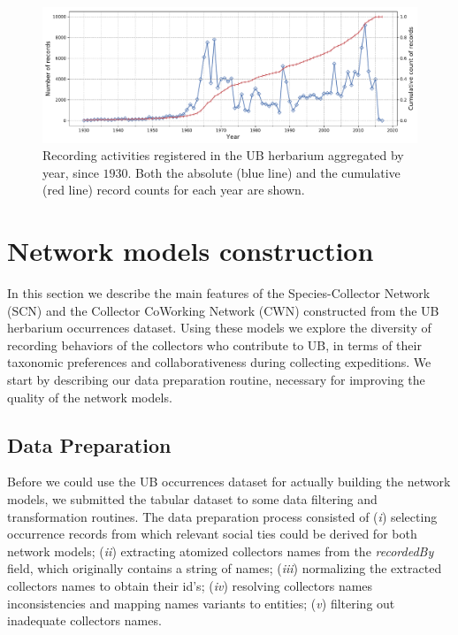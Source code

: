\begin{figure}[h!]
\centering
\includegraphics[width=\linewidth]{figures/casestudy_ub/ub_records_timeseries.pdf}
\caption[Recording activities registered in the UB herbarium aggregated by year, since $1930$.]{Recording activities registered in the UB herbarium aggregated by year, since $1930$. Both the absolute (blue line) and the cumulative (red line) record counts for each year are shown.}
\label{fig:ub_records_timeseries}
\end{figure}


\clearpage


\section{Network models construction}

In this section we describe the main features of the Species-Collector Network (SCN) and the Collector CoWorking Network (CWN) constructed from the UB herbarium occurrences dataset.
Using these models we explore the diversity of recording behaviors of the collectors who contribute to UB, in terms of their taxonomic preferences and collaborativeness during collecting expeditions.
We start by describing our data preparation routine, necessary for improving the quality of the network models.

\subsection{Data Preparation} \label{section:ub_data_preparation}
Before we could use the UB occurrences dataset for actually building the network models, we submitted the tabular dataset to some data filtering and transformation routines.
The data preparation process consisted of 
(\textit{i}) selecting occurrence records from which relevant social ties could be derived for both network models; 
(\textit{ii}) extracting atomized collectors names from the \textit{recordedBy} field, which originally contains a string of names;
(\textit{iii}) normalizing the extracted collectors names to obtain their id's;
(\textit{iv}) resolving collectors names inconsistencies and mapping names variants to entities;
(\textit{v}) filtering out inadequate collectors names. %

